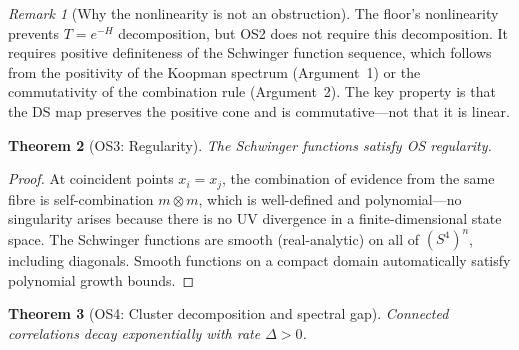 \documentclass[11pt,a4paper]{article}
\newtheorem{theorem}{Theorem}[section]
\theoremstyle{definition}
\theoremstyle{remark}
\newtheorem{remark}[theorem]{Remark}
\begin{document}
\begin{remark}[Why the nonlinearity is not an obstruction]
The floor's nonlinearity prevents $T=e^{-H}$ decomposition, but OS2 does not require this decomposition. It requires positive definiteness of the Schwinger function sequence, which follows from the positivity of the Koopman spectrum (Argument~1) or the commutativity of the combination rule (Argument~2). The key property is that the DS map preserves the positive cone and is commutative---not that it is linear.
\end{remark}

\begin{theorem}[OS3: Regularity]\label{thm:OS3}
The Schwinger functions satisfy OS regularity.
\end{theorem}

\begin{proof}
At coincident points $x_i=x_j$, the combination of evidence from the same fibre is self-combination $m\otimes m$, which is well-defined and polynomial---no singularity arises because there is no UV divergence in a finite-dimensional state space. The Schwinger functions are smooth (real-analytic) on all of $(S^4)^n$, including diagonals. Smooth functions on a compact domain automatically satisfy polynomial growth bounds.
\end{proof}

\begin{theorem}[OS4: Cluster decomposition and spectral gap]\label{thm:OS4}
Connected correlations decay exponentially with rate $\Delta>0$.
\end{theorem}
\end{document}
